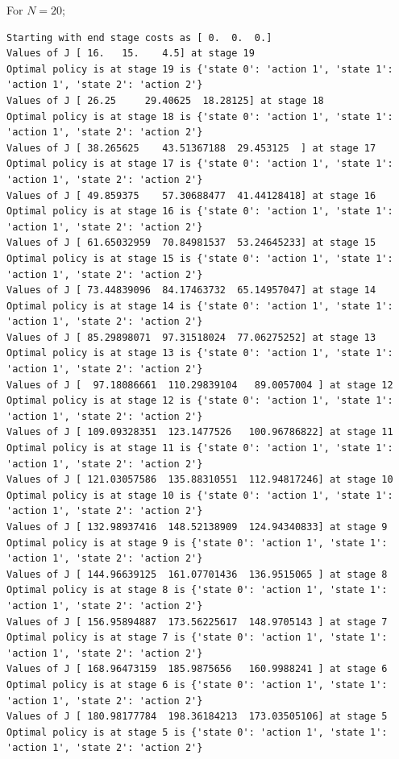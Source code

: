 For $N=20$;

\begin{lstlisting}[numbers = none]
Starting with end stage costs as [ 0.  0.  0.]
Values of J [ 16.   15.    4.5] at stage 19
Optimal policy is at stage 19 is {'state 0': 'action 1', 'state 1': 'action 1', 'state 2': 'action 2'}
Values of J [ 26.25     29.40625  18.28125] at stage 18
Optimal policy is at stage 18 is {'state 0': 'action 1', 'state 1': 'action 1', 'state 2': 'action 2'}
Values of J [ 38.265625    43.51367188  29.453125  ] at stage 17
Optimal policy is at stage 17 is {'state 0': 'action 1', 'state 1': 'action 1', 'state 2': 'action 2'}
Values of J [ 49.859375    57.30688477  41.44128418] at stage 16
Optimal policy is at stage 16 is {'state 0': 'action 1', 'state 1': 'action 1', 'state 2': 'action 2'}
Values of J [ 61.65032959  70.84981537  53.24645233] at stage 15
Optimal policy is at stage 15 is {'state 0': 'action 1', 'state 1': 'action 1', 'state 2': 'action 2'}
Values of J [ 73.44839096  84.17463732  65.14957047] at stage 14
Optimal policy is at stage 14 is {'state 0': 'action 1', 'state 1': 'action 1', 'state 2': 'action 2'}
Values of J [ 85.29898071  97.31518024  77.06275252] at stage 13
Optimal policy is at stage 13 is {'state 0': 'action 1', 'state 1': 'action 1', 'state 2': 'action 2'}
Values of J [  97.18086661  110.29839104   89.0057004 ] at stage 12
Optimal policy is at stage 12 is {'state 0': 'action 1', 'state 1': 'action 1', 'state 2': 'action 2'}
Values of J [ 109.09328351  123.1477526   100.96786822] at stage 11
Optimal policy is at stage 11 is {'state 0': 'action 1', 'state 1': 'action 1', 'state 2': 'action 2'}
Values of J [ 121.03057586  135.88310551  112.94817246] at stage 10
Optimal policy is at stage 10 is {'state 0': 'action 1', 'state 1': 'action 1', 'state 2': 'action 2'}
Values of J [ 132.98937416  148.52138909  124.94340833] at stage 9
Optimal policy is at stage 9 is {'state 0': 'action 1', 'state 1': 'action 1', 'state 2': 'action 2'}
Values of J [ 144.96639125  161.07701436  136.9515065 ] at stage 8
Optimal policy is at stage 8 is {'state 0': 'action 1', 'state 1': 'action 1', 'state 2': 'action 2'}
Values of J [ 156.95894887  173.56225617  148.9705143 ] at stage 7
Optimal policy is at stage 7 is {'state 0': 'action 1', 'state 1': 'action 1', 'state 2': 'action 2'}
Values of J [ 168.96473159  185.9875656   160.9988241 ] at stage 6
Optimal policy is at stage 6 is {'state 0': 'action 1', 'state 1': 'action 1', 'state 2': 'action 2'}
Values of J [ 180.98177784  198.36184213  173.03505106] at stage 5
Optimal policy is at stage 5 is {'state 0': 'action 1', 'state 1': 'action 1', 'state 2': 'action 2'}

\end{lstlisting}
